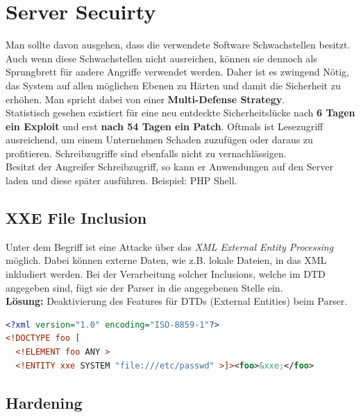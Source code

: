 \section{Server Secuirty}

Man sollte davon ausgehen, dass die verwendete Software Schwachstellen besitzt. Auch wenn diese Schwachstellen nicht ausreichen, können sie dennoch als Sprungbrett für andere Angriffe verwendet werden. Daher ist es zwingend Nötig, das System auf allen möglichen Ebenen zu Härten und damit die Sicherheit zu erhöhen. Man spricht dabei von einer \textbf{Multi-Defense Strategy}.\\

Statistisch gesehen existiert für eine neu entdeckte Sicherheitslücke nach \textbf{6 Tagen ein Exploit} und erst \textbf{nach 54 Tagen ein Patch}. Oftmals ist Lesezugriff ausreichend, um einem Unternehmen Schaden zuzufügen oder daraus zu profitieren. Schreibzugriffe sind ebenfalls nicht zu vernachlässigen.\\

Besitzt der Angreifer Schreibzugriff, so kann er Anwendungen auf den Server laden und diese später ausführen. Beispiel: PHP Shell.

\subsection{XXE File Inclusion}
Unter dem Begriff ist eine Attacke über das \textit{XML External Entity Processing} möglich. Dabei können externe Daten, wie z.B. lokale Dateien, in das XML inkludiert werden. Bei der Verarbeitung solcher Inclusions, welche im DTD angegeben sind, fügt sie der Parser in die angegebenen Stelle ein.\\

\textbf{Lösung:} Deaktivierung des Features für DTDs (External Entities) beim Parser.

\begin{lstlisting}[language=XML, caption=Beispiel der XXE]
<?xml version="1.0" encoding="ISO-8859-1"?>
<!DOCTYPE foo [  
  <!ELEMENT foo ANY >
  <!ENTITY xxe SYSTEM "file:///etc/passwd" >]><foo>&xxe;</foo>
\end{lstlisting}


\subsection{Hardening}

